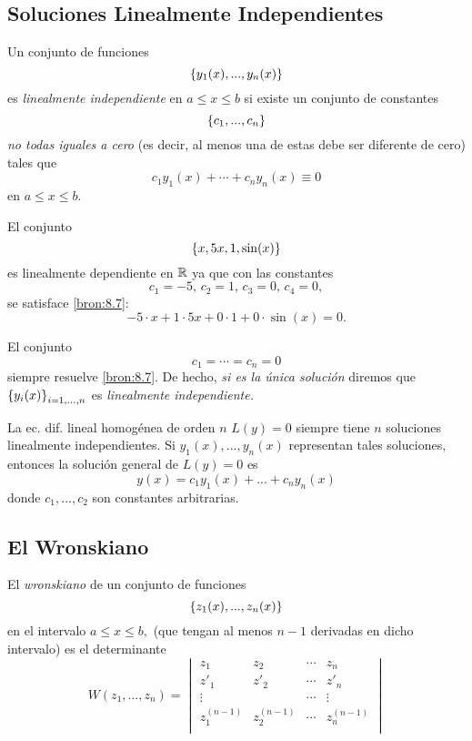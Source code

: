 \subsection{Soluciones Linealmente Independientes}


	Un conjunto de funciones
	$$
	\left\{ y_{1}(x),...,y_{n}(x) \right\}
	$$
	es \emph{linealmente independiente} en $a\leq x \leq b$ si existe un conjunto de constantes
	$$
	\left\{ c_{1}, ..., c_{n} \right\}
	$$ \emph{no todas iguales a cero} (es decir, al menos una de estas debe ser diferente de cero) tales que
	\[
		\label{bron:8.7}
		c_{1}y_{1}(x)+\cdots+c_{n}y_{n}(x)\equiv 0
	\]
	en $a\leq x \leq b.$



	\begin{resuelto}
		El conjunto
		$$
		\left\{ x, 5x, 1, \sin(x) \right\}
		$$es linealmente dependiente en $\mathbb{R}$ ya que con las constantes
		$$c_{1}=-5, \, c_{2}=1, \, c_{3}=0, \, c_{4}=0,$$ se satisface \eqref{bron:8.7}:
		$$
		-5\cdot x+1\cdot 5x+0\cdot 1+0\cdot \sin(x)=0.
		$$
	\end{resuelto}




	\begin{observacion}
		El conjunto $$c_{1}=\cdots =c_{n}=0$$ siempre resuelve \eqref{bron:8.7}. De hecho, \emph{si es la única soluci\'on}  diremos que $\left\{ y_{i}(x) \right\}_{i=1,...,n}$ es \emph{linealmente independiente.}
	\end{observacion}




	La ec. dif. lineal homog\'enea de orden $n$ $L(y)=0$ siempre tiene $n$ soluciones linealmente independientes. Si $y_{1}(x),...,y_{n}(x)$ representan tales soluciones, entonces la soluci\'on general de $L(y)=0$ es
	\[
		\label{bron:8.8}
		y(x)=c_{1}y_{1}(x)+...+c_{n}y_{n}(x)
	\]
	donde $c_{1},...,c_{2}$ son constantes arbitrarias.


\subsection{El Wronskiano}


	El \emph{wronskiano} de un conjunto de funciones
	$$
	\left\{ z_{1}(x),...,z_{n}(x) \right\}
	$$en el intervalo $a\leq x \leq b,$ (que tengan al menos $n-1$ derivadas en dicho intervalo) es el determinante
	$$
	W(z_{1},...,z_{n})=
	\begin{vmatrix}
		z_{1} & z_{2} & \cdots & z_{n} \\
		z'_{1} & z'_{2} & \cdots & z'_{n} \\
		\vdots & & \cdots & \vdots \\
		z^{(n-1)}_{1} & z^{(n-1)}_{2} & \cdots & z^{(n-1)}_{n} \\
	\end{vmatrix}
	$$



